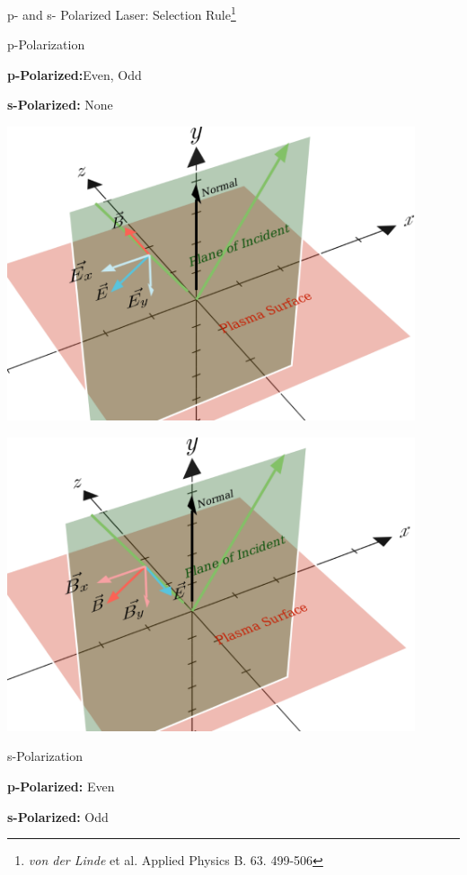 \documentclass{beamer}
\begin{document}
\begin{frame}{p- and s- Polarized Laser: Selection Rule\footnote{\textit{von der Linde} et al. Applied Physics B. 63. 499-506}}
    \begin{minipage}[h]{0.18\linewidth}
        \small{p-Polarization}
        \tiny{
            \textbf{p-Polarized:}Even, Odd

            \textbf{s-Polarized:} None}
    \end{minipage}
    \begin{minipage}[h]{0.8\linewidth}
        \centering
        \includegraphics[width=0.9\textwidth, height=0.42\textheight]{images/p.png}
        \label{fig:p}
    \end{minipage}

    \begin{minipage}[h]{0.8\linewidth}
        \centering
        \includegraphics[width=0.9\textwidth, height=0.42\textheight]{images/s.png}
        \label{fig:s}
    \end{minipage}
    \begin{minipage}[h]{0.18\linewidth}
        \small{s-Polarization}
        \tiny{
            \textbf{p-Polarized:} Even

            \textbf{s-Polarized:} Odd}
    \end{minipage}
\end{frame}
\end{document}
